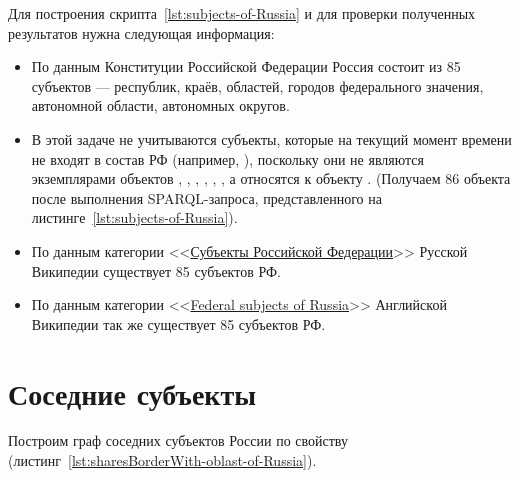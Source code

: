 Для построения скрипта~\ref{lst:subjects-of-Russia} и для проверки полученных результатов нужна следующая информация:
\begin{itemize}
  \item По данным Конституции Российской Федерации Россия состоит из 85 субъектов — республик, краёв, областей, городов федерального значения, автономной области, автономных округов.
  \item В этой задаче не учитываются субъекты, которые на текущий момент времени не входят в состав РФ (например, ), поскольку они не являются экземплярами объектов , , , , , , а относятся к объекту . (Получаем 86 объекта после выполнения SPARQL-запроса, представленного на листинге~\ref{lst:subjects-of-Russia}). 
  \item По данным категории <<\href{https://ru.wikipedia.org/wiki/Субъекты_Российской_Федерации}{Субъекты Российской Федерации}>> Русской Википедии существует 85 субъектов РФ.
  \item По данным категории <<\href{https://ru.wikipedia.org/wiki/en:Federal_subjects_of_Russia}{Federal subjects of Russia}>> Английской Википедии так же существует 85 субъектов РФ.
\end{itemize}


\section{Соседние субъекты}

Построим граф соседних субъектов России по свойству  (листинг~\ref{lst:sharesBorderWith-oblast-of-Russia}).

